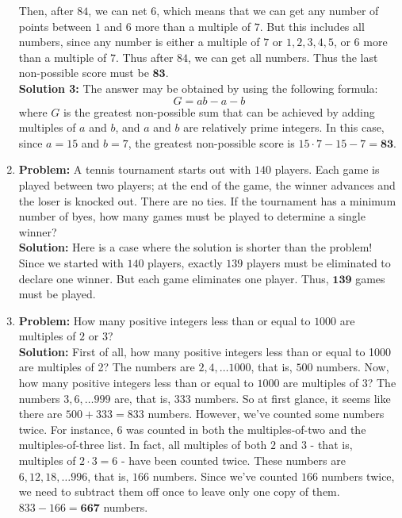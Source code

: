 \documentclass{article}
\begin{document}
\begin{enumerate}
Then, after $84$, we can net $6$, which means that we can get any number of points between $1$ and $6$ more than a multiple of $7$.  But this includes all numbers, since any number is either a multiple of $7$ or $1, 2, 3, 4, 5$, or $6$ more than a multiple of $7$.  Thus after $84$, we can get all numbers.  Thus the last non-possible score must be $\mathbf{83}$. \\

\textbf{Solution 3:} The answer may be obtained by using the following formula:
\[G = ab - a - b\]
where $G$ is the greatest non-possible sum that can be achieved by adding multiples of $a$ and $b$, and $a$ and $b$ are relatively prime integers.  In this case, since $a = 15$ and $b = 7$, the greatest non-possible score is $15 \cdot 7 - 15 - 7 = \mathbf{83}$.


\item \textbf{Problem:} A tennis tournament starts out with $140$ players.  Each game is played between two players; at the end of the game, the winner advances and the loser is knocked out.  There are no ties.  If the tournament has a minimum number of byes, how many games must be played to determine a single winner? \\

\textbf{Solution:} Here is a case where the solution is shorter than the problem!  Since we started with $140$ players, exactly $139$ players must be eliminated to declare one winner. But each game eliminates one player. Thus, $\mathbf{139}$ games must be played.

\item \textbf{Problem:} How many positive integers less than or equal to $1000$ are multiples of $2$ or $3$? \\

\textbf{Solution:} First of all, how many positive integers less than or equal to 1000 are multiples of 2?  The numbers are $2, 4, \ldots 1000$, that is, $500$ numbers.   Now, how many positive integers less than or equal to $1000$ are multiples of $3$?  The numbers $3, 6, \ldots 999$ are, that is, $333$ numbers.  So at first glance, it seems like there are $500 + 333 = 833$ numbers.  However, we've counted some numbers twice.  For instance, $6$ was counted in both the multiples-of-two and the multiples-of-three list.  In fact, all multiples of both $2$ and $3$ - that is, multiples of $2 \cdot 3 = 6$ - have been counted twice.  These numbers are $6, 12, 18, \ldots 996$, that is, $166$ numbers.  Since we've counted $166$ numbers twice, we need to subtract them off once to leave only one copy of them.  $833 - 166 = \mathbf{667}$ numbers.


\end{enumerate}
\end{document}
